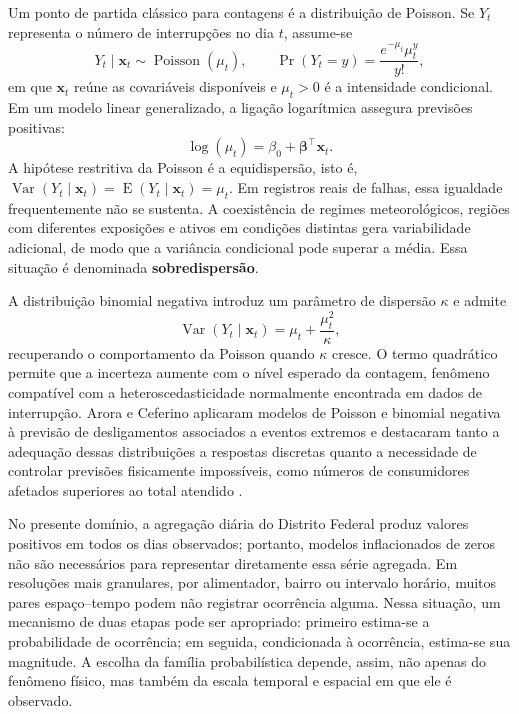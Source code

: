 Um ponto de partida clássico para contagens é a distribuição de Poisson. Se $Y_t$ representa o número de interrupções no dia $t$, assume-se
\begin{equation}
    Y_t \mid \mathbf{x}_t \sim \operatorname{Poisson}(\mu_t),
    \qquad
    \Pr(Y_t=y)=\frac{e^{-\mu_t}\mu_t^y}{y!},
    \label{eq:poisson_interrupcoes}
\end{equation}
em que $\mathbf{x}_t$ reúne as covariáveis disponíveis e $\mu_t>0$ é a intensidade condicional. Em um modelo linear generalizado, a ligação logarítmica assegura previsões positivas:
\begin{equation}
    \log(\mu_t)=\beta_0+\boldsymbol{\beta}^{\top}\mathbf{x}_t.
    \label{eq:poisson_link}
\end{equation}
A hipótese restritiva da Poisson é a equidispersão, isto é, $\operatorname{Var}(Y_t\mid\mathbf{x}_t)=\operatorname{E}(Y_t\mid\mathbf{x}_t)=\mu_t$. Em registros reais de falhas, essa igualdade frequentemente não se sustenta. A coexistência de regimes meteorológicos, regiões com diferentes exposições e ativos em condições distintas gera variabilidade adicional, de modo que a variância condicional pode superar a média. Essa situação é denominada \textbf{sobredispersão}.

A distribuição binomial negativa introduz um parâmetro de dispersão $\kappa$ e admite
\begin{equation}
    \operatorname{Var}(Y_t\mid\mathbf{x}_t)
    =\mu_t+\frac{\mu_t^2}{\kappa},
    \label{eq:binomial_negativa_var}
\end{equation}
recuperando o comportamento da Poisson quando $\kappa$ cresce. O termo quadrático permite que a incerteza aumente com o nível esperado da contagem, fenômeno compatível com a heteroscedasticidade normalmente encontrada em dados de interrupção. Arora e Ceferino aplicaram modelos de Poisson e binomial negativa à previsão de desligamentos associados a eventos extremos e destacaram tanto a adequação dessas distribuições a respostas discretas quanto a necessidade de controlar previsões fisicamente impossíveis, como números de consumidores afetados superiores ao total atendido \cite{arora2023probabilistic}.

No presente domínio, a agregação diária do Distrito Federal produz valores positivos em todos os dias observados; portanto, modelos inflacionados de zeros não são necessários para representar diretamente essa série agregada. Em resoluções mais granulares, por alimentador, bairro ou intervalo horário, muitos pares espaço--tempo podem não registrar ocorrência alguma. Nessa situação, um mecanismo de duas etapas pode ser apropriado: primeiro estima-se a probabilidade de ocorrência; em seguida, condicionada à ocorrência, estima-se sua magnitude. A escolha da família probabilística depende, assim, não apenas do fenômeno físico, mas também da escala temporal e espacial em que ele é observado.

